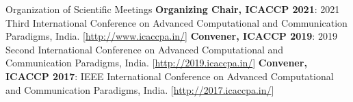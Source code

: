 \begin{rubric}{Organization of Scientific Meetings}
\entry*[22/03/2021-24/03/2021] \textbf{Organizing Chair, ICACCP 2021}: 2021 Third International Conference on Advanced Computational and Communication Paradigms, India. [\url{http://www.icaccpa.in/}]
\entry*[25/02/2019-28/02/2019] \textbf{Convener, ICACCP 2019}: 2019 Second International Conference on Advanced Computational and Communication Paradigms, India. [\url{http://2019.icaccpa.in/}]
\entry*[08/08/2017-10/8/2017] \textbf{Convener, ICACCP 2017}: IEEE International Conference on Advanced Computational and Communication Paradigms, India. [\url{http://2017.icaccpa.in/}]
\end{rubric}